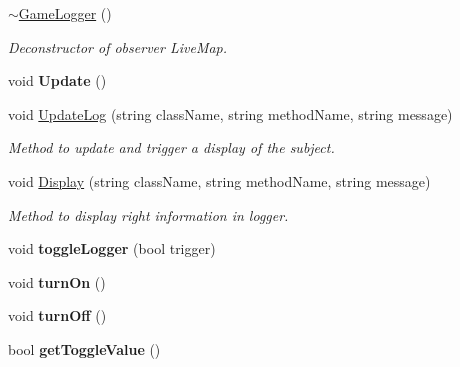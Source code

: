 \begin{DoxyCompactItemize}
\item 
\hypertarget{class_game_logger_ae27b9c09da9f5303c83f6492f7ca70f8}{}\label{class_game_logger_ae27b9c09da9f5303c83f6492f7ca70f8} 
\hyperlink{class_game_logger_ae27b9c09da9f5303c83f6492f7ca70f8}{$\sim$\+Game\+Logger} ()
\begin{DoxyCompactList}\small\item\em Deconstructor of observer Live\+Map. \end{DoxyCompactList}\item 
\hypertarget{class_game_logger_a0203659fbcc57a97ed200e68576f9b3e}{}\label{class_game_logger_a0203659fbcc57a97ed200e68576f9b3e} 
void {\bfseries Update} ()
\item 
\hypertarget{class_game_logger_a713c2bec795decf271a195c9143c192d}{}\label{class_game_logger_a713c2bec795decf271a195c9143c192d} 
void \hyperlink{class_game_logger_a713c2bec795decf271a195c9143c192d}{Update\+Log} (string class\+Name, string method\+Name, string message)
\begin{DoxyCompactList}\small\item\em Method to update and trigger a display of the subject. \end{DoxyCompactList}\item 
\hypertarget{class_game_logger_a0e9b2e4d6cbb26ea32506601a3a30fac}{}\label{class_game_logger_a0e9b2e4d6cbb26ea32506601a3a30fac} 
void \hyperlink{class_game_logger_a0e9b2e4d6cbb26ea32506601a3a30fac}{Display} (string class\+Name, string method\+Name, string message)
\begin{DoxyCompactList}\small\item\em Method to display right information in logger. \end{DoxyCompactList}\item 
\hypertarget{class_game_logger_a9e04f8003ca6473ba0ff79eb49920ee5}{}\label{class_game_logger_a9e04f8003ca6473ba0ff79eb49920ee5} 
void {\bfseries toggle\+Logger} (bool trigger)
\item 
\hypertarget{class_game_logger_a7bf002b2aef218b4c95d87c674e9e7e9}{}\label{class_game_logger_a7bf002b2aef218b4c95d87c674e9e7e9} 
void {\bfseries turn\+On} ()
\item 
\hypertarget{class_game_logger_a01a0a7ce1e1be0e1490b947db4d21be1}{}\label{class_game_logger_a01a0a7ce1e1be0e1490b947db4d21be1} 
void {\bfseries turn\+Off} ()
\item 
\hypertarget{class_game_logger_ac9fb804eef6df4b89a4809da72ff1a09}{}\label{class_game_logger_ac9fb804eef6df4b89a4809da72ff1a09} 
bool {\bfseries get\+Toggle\+Value} ()
\end{DoxyCompactItemize}

